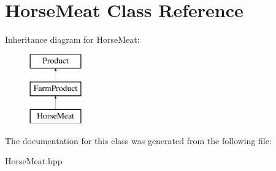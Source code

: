 \hypertarget{class_horse_meat}{}\section{Horse\+Meat Class Reference}
\label{class_horse_meat}
Inheritance diagram for Horse\+Meat\+:\begin{figure}[H]
\begin{center}
\leavevmode
\includegraphics[height=3.000000cm]{class_horse_meat}
\end{center}
\end{figure}


The documentation for this class was generated from the following file\+:\begin{DoxyCompactItemize}
\item 
Horse\+Meat.\+hpp\end{DoxyCompactItemize}
